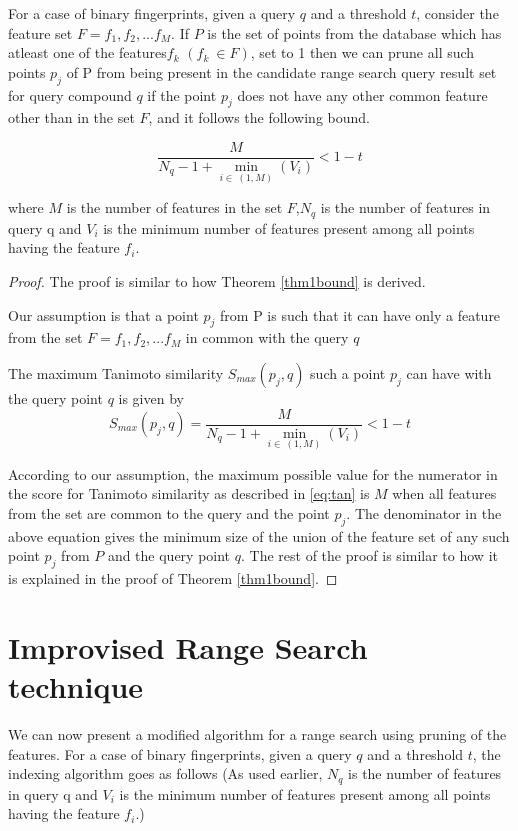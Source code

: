 \begin{thm}
\label{thm2bound}
For a case of binary fingerprints, given a query $q$ and a threshold $t$, consider the feature set $F=f_1, f_2,...f_M$. If $P$ is the set of points from the database which has atleast one of the features$f_k$  $(f_k~\in F)$, set to 1 then we can prune all such points $p_j$ of P from being present in the candidate range search query result set for query compound $q$ if the point $p_j$ does not have any other common feature other than in the set $F$, and it follows the following bound. 

\begin{equation}
\label{eq:boun2}
\frac{M}{N_q - 1 + \min\limits_{i\in~(1,M)}(V_i) } < 1-t 
\end{equation}

where $M$ is the number of features in the set $F$,$N_q$ is the number of features in query q and $V_{i}$ is the minimum number of features present among all points having the feature $f_i$.




\end{thm}

\begin{proof}
\label{proof2}
The proof is similar to how Theorem \autoref{thm1bound} is derived. 



Our assumption is that a point $p_j$ from P is such that it can have only a feature from the set $F=f_1, f_2,...f_M$ in common with the query $q$  
 
The maximum Tanimoto similarity $S_{max}(p_j,q)$ such a point $p_j$ can have with the query point $q$ is given by
\begin{equation}
\label{eq:max2}
S_{max}(p_j,q)=\frac{M}{N_q - 1 + \min\limits_{i\in~(1,M)}(V_i) } < 1-t 
\end{equation}

According to our assumption, the maximum possible value for the numerator in the score for Tanimoto similarity as described in \autoref{eq:tan} is $M$ when all features from the set are common to the query and the point $p_j$. The denominator in the above equation gives the minimum size of the union of the feature set of any such point $p_j$ from $P$ and the query point $q$. 
The rest of the proof is similar to how it is explained in the proof of Theorem \autoref{thm1bound}.
\end{proof}


\section{Improvised Range Search technique}
\label{sec:prune1.1}
We can now present a modified algorithm for a range search using pruning of the features. For a case of binary fingerprints, given a query $q$ and a threshold  $t$, the indexing algorithm goes as follows (As used earlier, $N_q$ is the number of features in query q and $V_{i}$ is the minimum number of features present among all points having the feature $f_i$.)

